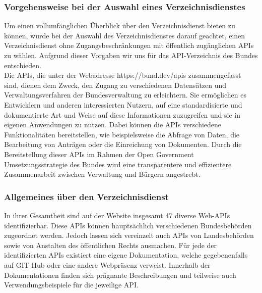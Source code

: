 \documentclass[notitlepage, hidelinks]{article}
\begin{document}
\subsubsection{Vorgehensweise bei der Auswahl eines Verzeichnisdienstes}
Um einen vollumfänglichen Überblick über den Verzeichnisdienst bieten zu können, wurde bei der Auswahl des Verzeichnisdienstes darauf geachtet, einen Verzeichnisdienst ohne Zugangsbeschränkungen mit öffentlich zugänglichen APIs zu wählen. Aufgrund dieser Vorgaben wir uns für das API-Verzeichnis des Bundes entschieden. \\
Die APIs, die unter der Webadresse https://bund.dev/apis zusammengefasst sind, dienen dem Zweck, den Zugang zu verschiedenen Datensätzen und Verwaltungsverfahren der Bundesverwaltung zu erleichtern. Sie ermöglichen es Entwicklern und anderen interessierten Nutzern, auf eine standardisierte und dokumentierte Art und Weise auf diese Informationen zuzugreifen und sie in eigenen Anwendungen zu nutzen. Dabei können die APIs verschiedene Funktionalitäten bereitstellen, wie beispielsweise die Abfrage von Daten, die Bearbeitung von Anträgen oder die Einreichung von Dokumenten. Durch die Bereitstellung dieser APIs im Rahmen der Open Government Umsetzungsstrategie des Bundes wird eine transparentere und effizientere Zusammenarbeit zwischen Verwaltung und Bürgern angestrebt.

\subsubsection{Allgemeines über den Verzeichnisdienst}
In ihrer Gesamtheit sind auf der Website insgesamt 47 diverse Web-APIs identifizierbar. Diese APIs können hauptsächlich verschiedenen Bundesbehörden zugeordnet werden. Jedoch lassen sich vereinzelt auch APIs von Landesbehörden sowie von Anstalten des öffentlichen Rechts ausmachen. Für jede der identifizierten APIs existiert eine eigene Dokumentation, welche gegebenenfalls auf GIT Hub oder eine andere Webpräsenz verweist. Innerhalb der Dokumentationen finden sich prägnante Beschreibungen und teilweise auch Verwendungsbeispiele für die jeweilige API.
\end{document}
